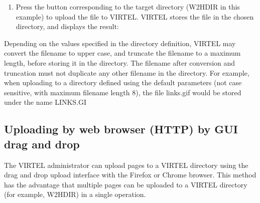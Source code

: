 \documentclass[letterpaper,10pt,english]{sphinxmanual}
\begin{document}
\sphinxAtStartPar
{}

\sphinxAtStartPar
{}
\begin{enumerate}
%
\setcounter{enumi}{4}
\item {} 
\sphinxAtStartPar
Press the button corresponding to the target directory (W2H\sphinxhyphen{}DIR in this example) to upload the file to VIRTEL. VIRTEL stores the file in the chosen directory, and displays the result:

\end{enumerate}

\sphinxAtStartPar
{}

\sphinxAtStartPar
{}

\sphinxAtStartPar
Depending on the values specified in the directory definition, VIRTEL may convert the filename to upper case, and truncate the filename to a maximum length, before storing it in the directory. The filename after conversion and truncation must not duplicate any other filename in the directory. For example, when uploading to a directory defined using the default parameters (not case sensitive, with maximum filename length 8), the file links.gif would be stored under the name LINKS.GI

\newpage

\ignorespaces 

\subsection{Uploading by web browser (HTTP) by GUI drag and drop}
\label{\detokenize{audit_operations_ and_performance:uploading-by-web-browser-http-by-gui-drag-and-drop}}\label{\detokenize{audit_operations_ and_performance:index-60}}
\sphinxAtStartPar
The VIRTEL administrator can upload pages to a VIRTEL directory using the drag and drop upload interface with the Firefox or Chrome browser. This method has the advantage that multiple pages can be uploaded to a VIRTEL directory (for example, W2H\sphinxhyphen{}DIR) in a single operation.
\end{document}
